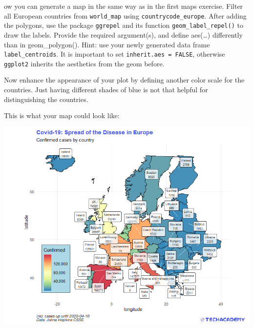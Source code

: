 \documentclass[
  11pt,
]{article}
\newenvironment{tips}[1]
  {
  \begin{itemize}
  \footnotesize
  \renewcommand{\labelitemi}{
    \raisebox{-.7\height}[0pt][0pt]{
      {\setkeys{Gin}{width=3em,keepaspectratio}
        \texttt{[image: images/\#1.png]}}
    }
  }
  \setlength{\fboxsep}{1em}
  \begin{rbox}
  \item
  }
  {
  \end{rbox}
  \end{itemize}
  }
\begin{document}
\begin{tips}
Now you can generate a map in the same way as in the first maps exercise. Filter all European countries from \texttt{world\_map} using \texttt{countrycode\_europe}. After adding the polygons, use the package \texttt{ggrepel} and its function \texttt{geom\_label\_repel()} to draw the labels. Provide the required argument(s), and define aes(\ldots) differently than in geom\_polygon(). Hint: use your newly generated data frame \texttt{label\_centroids}. It is important to set \texttt{inherit.aes\ =\ FALSE}, otherwise \texttt{ggplot2} inherits the aesthetics from the geom before.

Now enhance the appearance of your plot by defining another color scale for the countries. Just having different shades of blue is not that helpful for distinguishing the countries.

\end{tips}

\begin{tips}r

This is what your map could look like:

\begin{center}\includegraphics[width=1\linewidth]{plots/r-map-label} \end{center}

\end{tips}
\end{document}
